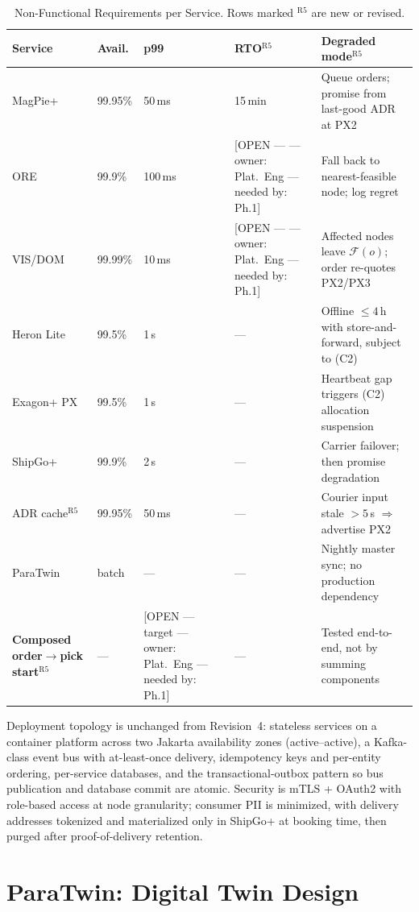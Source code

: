 \documentclass[10pt,twocolumn,letterpaper]{article}
\theoremstyle{definition}
\newcommand{\OPEN}[3]{{\color{openred}\footnotesize\textsf{[OPEN --- #1 --- owner: #2 --- needed by: #3]}}}
\begin{document}
\begin{table}[t]
\caption{Non-Functional Requirements per Service. Rows marked $^{\mathrm{R5}}$ are new or revised.}
\label{tab:nfr}
\centering\footnotesize
\begin{tabular}{@{}p{1.35cm}p{0.95cm}p{0.75cm}p{1.05cm}p{2.5cm}@{}}
\toprule
\textbf{Service} & \textbf{Avail.} & \textbf{p99} & \textbf{RTO}$^{\mathrm{R5}}$ & \textbf{Degraded mode}$^{\mathrm{R5}}$\\
\midrule
MagPie+ & 99.95\% & 50\,ms & 15\,min & Queue orders; promise from last-good ADR at PX2\\
ORE & 99.9\% & 100\,ms & \OPEN{}{Plat.\ Eng}{Ph.1} & Fall back to nearest-feasible node; log regret\\
VIS/DOM & 99.99\% & 10\,ms & \OPEN{}{Plat.\ Eng}{Ph.1} & Affected nodes leave $\mathcal{F}(o)$; order re-quotes PX2/PX3\\
Heron Lite & 99.5\% & 1\,s & --- & Offline $\le4$\,h with store-and-forward, subject to (C2)\\
Exagon+ PX & 99.5\% & 1\,s & --- & Heartbeat gap triggers (C2) allocation suspension\\
ShipGo+ & 99.9\% & 2\,s & --- & Carrier failover; then promise degradation\\
ADR cache$^{\mathrm{R5}}$ & 99.95\% & 50\,ms & --- & Courier input stale $>5$\,s $\Rightarrow$ advertise PX2\\
ParaTwin & batch & --- & --- & Nightly master sync; no production dependency\\
\midrule
\textbf{Composed order$\to$pick start}$^{\mathrm{R5}}$ & --- & \OPEN{target}{Plat.\ Eng}{Ph.1} & --- & Tested end-to-end, not by summing components\\
\bottomrule
\end{tabular}
\end{table}

Deployment topology is unchanged from Revision~4: stateless services on a container platform across two Jakarta availability zones (active--active), a Kafka-class event bus with at-least-once delivery, idempotency keys and per-entity ordering, per-service databases, and the transactional-outbox pattern so bus publication and database commit are atomic. Security is mTLS + OAuth2 with role-based access at node granularity; consumer PII is minimized, with delivery addresses tokenized and materialized only in ShipGo+ at booking time, then purged after proof-of-delivery retention.

\section{ParaTwin: Digital Twin Design}\label{sec:twin}
\end{document}
